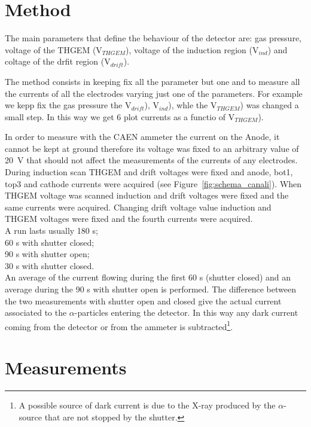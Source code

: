 \documentclass[a4paper, 11 pt]{article}
\begin{document}
\section{Method}

The main parameters that define the behaviour of the detector are: gas pressure, voltage of the THGEM (V$_{THGEM}$),
voltage of the induction region (V$_{ind}$) and coltage of the drfit region (V$_{drift}$).

The method consists in keeping fix all the parameter but one and to measure all the currents of all the
electrodes varying just one of the parameters.
For example we kepp fix the gas pressure the V$_{drift}$), V$_{ind}$), whle the V$_{THGEM}$) was
changed a small step. In this way we get 6 plot currents as a functio of V$_{THGEM}$).

In order to measure with the CAEN ammeter the current on the Anode, it cannot be kept at ground
therefore its voltage was fixed to an arbitrary value of 20~V that should not affect the 
measurements of the currents of any electrodes. 
During induction scan THGEM and drift voltages 
were fixed and anode, bot1, top3 and cathode currents were acquired (see 
Figure~\ref{fig:schema_canali}). When THGEM voltage was scanned induction and drift voltages were fixed and the same currents were acquired. Changing drift voltage value induction and THGEM voltages were fixed and the fourth currents were acquired.\\
A run lasts usually 180 s;\\
60 s with shutter closed;\\
90 s with shutter open;\\
30 s with shutter closed.\\
An average of the current flowing during the first 60 s (shutter closed) and an average during
the 90 s with shutter open is performed.
The difference between the two measurements with shutter open and closed give
 the actual current associated to the $\alpha$-particles entering the detector.
In this way any dark current coming from the detector or from the ammeter is subtracted\footnote{A possible source of
dark current is due to the X-ray produced by the $\alpha$-source that are not stopped by the shutter.}.\\

\clearpage

\section{Measurements}
\end{document}
